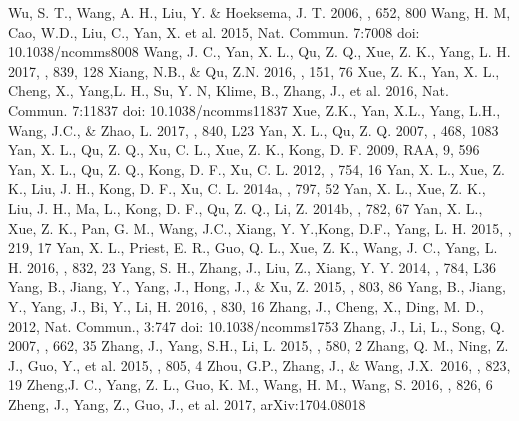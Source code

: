 \documentclass[12pt,preprint]{aastex}
\begin{document}
\begin{CJK*}{UTF8}{gbsn}
\begin{thebibliography}{}
 Wu, S. T., Wang, A. H., Liu, Y. \& Hoeksema, J. T. 2006, \apj, 652, 800
 Wang, H. M, Cao, W.D., Liu, C., Yan, X. et al. 2015, Nat. Commun. 7:7008 doi: 10.1038/ncomms8008
 Wang, J. C., Yan, X. L., Qu, Z. Q., Xue, Z. K., Yang, L. H. 2017, \apj, 839, 128
 Xiang, N.B., \& Qu, Z.N. 2016, \aj, 151, 76
 Xue, Z. K., Yan, X. L., Cheng, X., Yang,L. H., Su, Y. N, Klime, B., Zhang, J., et al. 2016, Nat. Commun. 7:11837 doi: 10.1038/ncomms11837 
 Xue, Z.K., Yan, X.L., Yang, L.H., Wang, J.C., \& Zhao, L. 2017, \apjl, 840, L23
 Yan, X. L., Qu, Z. Q. 2007, \aap, 468, 1083
 Yan, X. L., Qu, Z. Q., Xu, C. L., Xue, Z. K., Kong, D. F. 2009, RAA, 9, 596
 Yan, X. L., Qu, Z. Q., Kong, D. F., Xu, C. L. 2012, \apj, 754, 16
 Yan, X. L., Xue, Z. K., Liu, J. H., Kong, D. F., Xu, C. L. 2014a, \apj, 797, 52
 Yan, X. L., Xue, Z. K., Liu, J. H., Ma, L., Kong, D. F., Qu, Z. Q., Li, Z. 2014b, \apj, 782, 67
 Yan, X. L., Xue, Z. K., Pan, G. M., Wang, J.C., Xiang, Y. Y.,Kong, D.F., Yang, L. H. 2015, \apjs, 219, 17
 Yan, X. L., Priest, E. R., Guo, Q. L., Xue, Z. K., Wang, J. C., Yang, L. H. 2016, \apj, 832, 23
 Yang, S. H., Zhang, J., Liu, Z., Xiang, Y. Y. 2014, \apj, 784, L36
 Yang, B., Jiang, Y., Yang, J., Hong, J., \& Xu, Z. 2015, \apj, 803, 86
 Yang, B., Jiang, Y., Yang, J., Bi, Y., Li, H. 2016, \apj, 830, 16
 Zhang, J., Cheng, X., Ding, M. D., 2012, Nat. Commun., 3:747 doi: 10.1038/ncomms1753
 Zhang, J., Li, L., Song, Q. 2007, \apjl, 662, 35
 Zhang, J., Yang, S.H., Li, L. 2015, \aap, 580, 2
 Zhang, Q. M., Ning, Z. J., Guo, Y., et al. 2015, \apj, 805, 4 
 Zhou, G.P., Zhang, J., \& Wang, J.X.\  2016, \apjl, 823, 19
 Zheng,J. C., Yang, Z. L., Guo, K. M., Wang, H. M., Wang, S. 2016, \apj, 826, 6
 Zheng, J., Yang, Z., Guo, J., et al. 2017, arXiv:1704.08018 
\end{thebibliography}



\end{CJK*}
\end{document}
